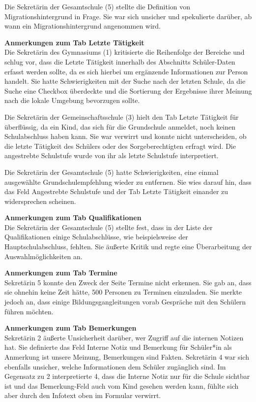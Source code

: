Die Sekretärin der Gesamtschule (5) stellte die Definition von \glqq Migrationshintergrund\grqq{} in Frage. Sie war sich unsicher und spekulierte darüber, ab wann ein Migrationshintergrund angenommen wird.

\textbf{Anmerkungen zum Tab \glqq Letzte Tätigkeit\grqq{}}\\
Die Sekretärin des Gymnasiums (1) kritisierte die Reihenfolge der Bereiche und schlug vor, dass die \glqq Letzte Tätigkeit\grqq{} innerhalb des Abschnitts \glqq Schüler-Daten\grqq{} erfasst werden sollte, da es sich hierbei um ergänzende Informationen zur Person handelt. Sie hatte Schwierigkeiten mit der Suche nach der letzten Schule, da die Suche eine Checkbox überdeckte und die Sortierung der Ergebnisse ihrer Meinung nach die lokale Umgebung bevorzugen sollte.

Die Sekretärin der Gemeinschaftsschule (3) hielt den Tab \glqq Letzte Tätigkeit\grqq{} für überflüssig, da ein Kind, das sich für die Grundschule anmeldet, noch keinen Schulabschluss haben kann. Sie war verwirrt und konnte nicht unterscheiden, ob die letzte Tätigkeit des Schülers oder des Sorgeberechtigten erfragt wird. Die angestrebte Schulstufe wurde von ihr als letzte Schulstufe interpretiert.

Die Sekretärin der Gesamtschule (5) hatte Schwierigkeiten, eine einmal ausgewählte Grundschulempfehlung wieder zu entfernen. Sie wies darauf hin, dass das Feld \glqq Angestrebte Schulstufe\grqq{} und der Tab \glqq Letzte Tätigkeit\grqq{} einander zu widersprechen scheinen.

\textbf{Anmerkungen zum Tab \glqq Qualifikationen\grqq{}}\\
Die Sekretärin der Gesamtschule (5) stellte fest, dass in der Liste der Qualifikationen einige Schulabschlüsse, wie beispielsweise der Hauptschulabschluss, fehlten. Sie äußerte Kritik und regte eine Überarbeitung der Auswahlmöglichkeiten an.

\textbf{Anmerkungen zum Tab \glqq Termine\grqq{}}\\
Sekretärin 5 konnte den Zweck der Seite \glqq Termine\grqq{} nicht erkennen. Sie gab an, dass sie ohnehin keine Zeit hätte, 500 Personen zu Terminen einzuladen. Sie merkte jedoch an, dass einige Bildungsgangleitungen vorab Gespräche mit den Schülern führen möchten.

\textbf{Anmerkungen zum Tab \glqq Bemerkungen\grqq{}}\\
Sekretärin 2 äußerte Unsicherheit darüber, wer Zugriff auf die internen Notizen hat. Sie definierte das Feld \glqq Interne Notiz\grqq{} und \glqq Bemerkung für Schüler*in\grqq{} als \glqq Anmerkung ist unsere Meinung, Bemerkungen sind Fakten\grqq{}. Sekretärin 4 war sich ebenfalls unsicher, welche Informationen dem Schüler zugänglich sind. Im Gegensatz zu 2 interpretierte 4, dass die \glqq Interne Notiz\grqq{} nur für die Schule sichtbar ist und das \glqq Bemerkung\grqq{}-Feld auch vom Kind gesehen werden kann, fühlte sich aber durch den Infotext oben im Formular verwirrt.

